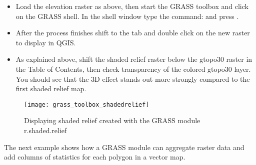 \begin{itemize}[label=--]
\item Load the  elevation raster as above, then start the
GRASS toolbox and click on the GRASS shell. In the shell window type the
command:\linebreak
{} \linebreak and press .
\end{itemize}

\begin{itemize}[label=--]
\item After the process finishes shift to the  tab and double click on
the new  raster to display in QGIS. 
\item As explained above, shift the shaded relief raster below the gtopo30
raster in the Table of Contents, then check transparency of the colored
gtopo30 layer. You should see that the 3D effect stands out more strongly
compared to the first shaded relief map.
\end{itemize}

\begin{figure}[ht]
 \centering
 \texttt{[image: grass\_toolbox\_shadedrelief]}
 \caption{Displaying shaded relief created with the GRASS module
r.shaded.relief \nixcaption}\label{fig:grass_toolbox_shadedrelief}
\end{figure}


The next example shows how a GRASS module can aggregate raster data and add
columns of statistics for each polygon in a vector map. 

